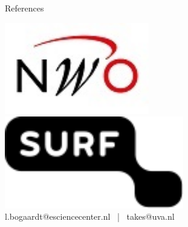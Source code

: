\documentclass[final]{beamer}
\newlength{\sepwid}
\newlength{\onecolwid}
\begin{document}
\begin{frame}[t]
\begin{columns}[t]
\begin{column}{\onecolwid}
\begin{alertblock}{References}
\end{alertblock}

\centering \includegraphics[height=40mm]{NWO.jpg} \hspace{24mm} \includegraphics[height=40mm]{Surf.png}
\\[3mm]
l.bogaardt@esciencecenter.nl \, | \, takes@uva.nl

\end{column} %

\begin{column}{\sepwid}\end{column} %

\end{columns} %

\end{frame} %
\end{document}
